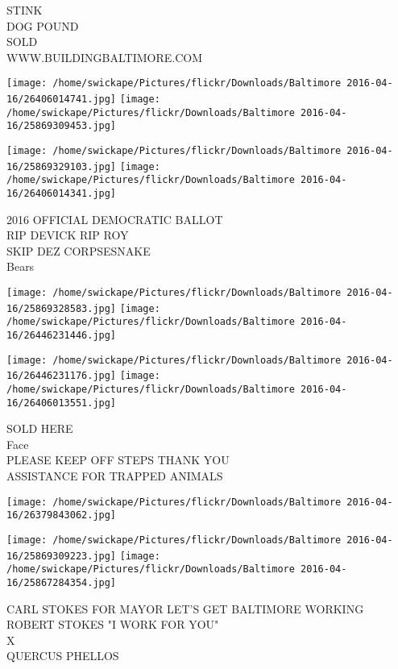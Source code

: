 \documentclass[10pt,letterpaper]{article}
\begin{document}
STINK\\
DOG POUND\\
SOLD\\
WWW.BUILDINGBALTIMORE.COM\\
\pagebreak

\texttt{[image: /home/swickape/Pictures/flickr/Downloads/Baltimore 2016-04-16/26406014741.jpg]}
\texttt{[image: /home/swickape/Pictures/flickr/Downloads/Baltimore 2016-04-16/25869309453.jpg]}

\texttt{[image: /home/swickape/Pictures/flickr/Downloads/Baltimore 2016-04-16/25869329103.jpg]}
\texttt{[image: /home/swickape/Pictures/flickr/Downloads/Baltimore 2016-04-16/26406014341.jpg]}

2016 OFFICIAL DEMOCRATIC BALLOT\\
RIP DEVICK RIP ROY\\
SKIP DEZ CORPSESNAKE\\
Bears\\
\pagebreak

\texttt{[image: /home/swickape/Pictures/flickr/Downloads/Baltimore 2016-04-16/25869328583.jpg]}
\texttt{[image: /home/swickape/Pictures/flickr/Downloads/Baltimore 2016-04-16/26446231446.jpg]}

\texttt{[image: /home/swickape/Pictures/flickr/Downloads/Baltimore 2016-04-16/26446231176.jpg]}
\texttt{[image: /home/swickape/Pictures/flickr/Downloads/Baltimore 2016-04-16/26406013551.jpg]}

SOLD HERE\\
Face\\
PLEASE KEEP OFF STEPS THANK YOU\\
ASSISTANCE FOR TRAPPED ANIMALS\\
\pagebreak

\texttt{[image: /home/swickape/Pictures/flickr/Downloads/Baltimore 2016-04-16/26379843062.jpg]}

\vspace{0.25in}
\texttt{[image: /home/swickape/Pictures/flickr/Downloads/Baltimore 2016-04-16/25869309223.jpg]}
\texttt{[image: /home/swickape/Pictures/flickr/Downloads/Baltimore 2016-04-16/25867284354.jpg]}

CARL STOKES FOR MAYOR LET'S GET BALTIMORE WORKING ROBERT STOKES "I WORK FOR YOU"\\
X\\
QUERCUS PHELLOS\\
\pagebreak
\end{document}
